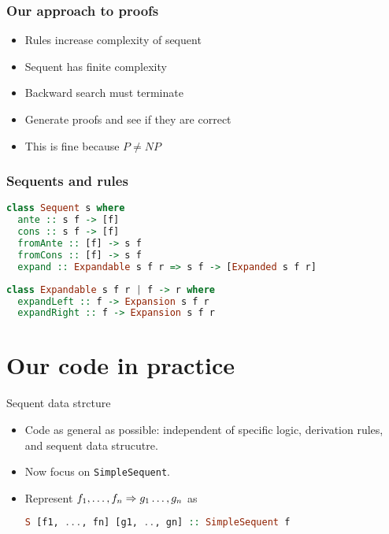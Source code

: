 \documentclass{beamer}
\begin{document}
\begin{frame}
    \frametitle{Our approach to proofs}

    \begin{itemize}
        \item Rules increase complexity of sequent
        \item Sequent has finite complexity
        \item Backward search must terminate
        \item Generate proofs and see if they are correct
        \item This is fine because \(P\neq NP\)
    \end{itemize}

\end{frame}

\begin{frame}[fragile]
    \frametitle{Sequents and rules}

    \begin{lstlisting}[language=Haskell]
class Sequent s where
  ante :: s f -> [f]
  cons :: s f -> [f]
  fromAnte :: [f] -> s f
  fromCons :: [f] -> s f
  expand :: Expandable s f r => s f -> [Expanded s f r]
    \end{lstlisting}

    \begin{lstlisting}[language=Haskell]
class Expandable s f r | f -> r where
  expandLeft :: f -> Expansion s f r
  expandRight :: f -> Expansion s f r
    \end{lstlisting}
\end{frame}

\section{Our code in practice}

\begin{frame}[fragile]{Sequent data strcture}


    \begin{itemize}
    	\item Code as general as possible: independent of specific logic, derivation rules, and sequent data strucutre.
    	\item Now focus on \texttt{SimpleSequent}.
        \item Represent $f_1, \ldots, f_n\Rightarrow g_1 \ldots, g_n$ as
        \vspace{1em}
   	\begin{lstlisting}[language=
    Haskell]
S [f1, ..., fn] [g1, .., gn] :: SimpleSequent f
    \end{lstlisting}
    \end{itemize}
\end{frame}
\end{document}
